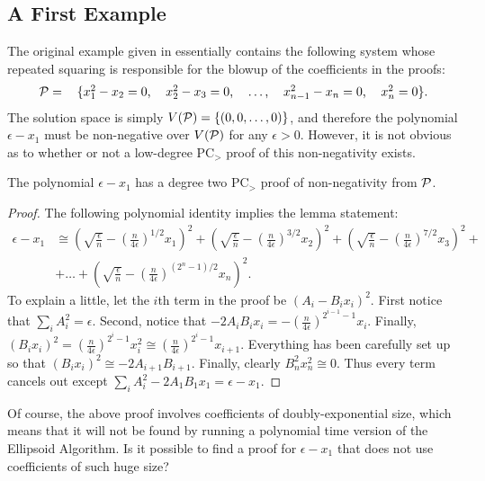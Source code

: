 \subsection{A First Example}
The original example given in \cite{ODon16} essentially contains the following system whose repeated squaring is responsible for the blowup of the coefficients in the proofs:
\[\begin{tabular}{cccccc}
$\cP = $ & $\{x_1^2 - x_2 = 0$, & $x_2^2 - x_3 = 0$, & $\dots$, & $x_{n-1}^2 - x_n = 0$, & $x_n^2 = 0\}$.
\end{tabular}\]
The solution space is simply $V(\mathcal P) = \{(0,0,\dots,0)\}$, and therefore the polynomial $\epsilon - x_1$ must be non-negative over $V(\mathcal P)$ for any $\epsilon > 0$. However, it is not obvious as to whether or not a low-degree PC$_>$ proof of this non-negativity exists.
\begin{lemma}
The polynomial $\epsilon - x_1$ has a degree two PC$_>$ proof of non-negativity from $\mathcal P$.
\end{lemma}
\begin{proof}
The following polynomial identity implies the lemma statement:
\begin{align}
\epsilon - x_1 &\cong\left(\sqrt{\frac{\epsilon}{n}} - \left(\frac{n}{4\epsilon}\right)^{1/2}x_1\right)^2 + \left(\sqrt{\frac{\epsilon}{n}} - \left(\frac{n}{4\epsilon}\right)^{3/2}x_2\right)^2 + \left(\sqrt{\frac{\epsilon}{n}} - \left(\frac{n}{4\epsilon}\right)^{7/2}x_3\right)^2 + \nonumber\\
&+\dots + \left(\sqrt{\frac{\epsilon}{n}} - \left(\frac{n}{4\epsilon}\right)^{(2^n-1)/2}x_n\right)^2.\label{eq:proof}\tag{$*$}
\end{align}
To explain a little, let the $i$th term in the proof be $(A_i - B_ix_i)^2$. First notice that $\sum_i A_i^2 = \epsilon$. Second, notice that $-2A_iB_ix_i = -\left(\frac{n}{4\epsilon}\right)^{2^{i-1}-1}x_i$. Finally, $(B_ix_i)^2 = \left(\frac{n}{4\epsilon}\right)^{2^i-1}x_i^2 \cong \left(\frac{n}{4\epsilon}\right)^{2^i-1}x_{i+1}$. Everything has been carefully set up so that $(B_ix_i)^2 \cong -2A_{i+1}B_{i+1}$. Finally, clearly $B_n^2x_n^2 \cong 0$. Thus every term cancels out except $\sum_i A_i^2-2A_1B_1x_1 = \epsilon-x_1$. 
\end{proof}
%
Of course, the above proof involves coefficients of doubly-exponential size, which means that it will not be found by running a polynomial time version of the Ellipsoid Algorithm. Is it possible to find a proof for $\epsilon - x_1$ that does not use coefficients of such huge size?
